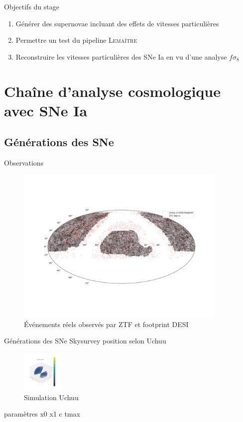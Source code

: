 \documentclass{beamer}
\newcommand{\lemaitre}{\textsc{Lemaître}\xspace}
\begin{document}
\begin{frame}{Objectifs du stage}
\begin{enumerate}
\itemsep2em 
\item Générer des supernovae incluant des effets de vitesses particulières
\item Permettre un test du pipeline \lemaitre
\item Reconstruire les vitesses particulières des SNe Ia en vu d'une analyse $f\sigma_8$
\end{enumerate}
\end{frame}

\section{Chaîne d'analyse cosmologique avec SNe Ia}



\subsection{Générations des SNe}

\begin{frame}{Observations}
\begin{figure}
	\centering
	\includegraphics[width=0.9\textwidth, trim = {3cm, 5cm, 2cm, 5cm}, clip]{figures/ZTF_on_DESI.png}
	\caption{Événements réels observés par ZTF et footprint DESI}
\end{figure}
\end{frame}

\begin{frame}{Générations des SNe}
Skysurvey
position selon Uchuu
\begin{figure}
	\centering
	\includegraphics[height=2cm, trim={2cm 2cm 2cm 2cm}, clip]{figures/Uchuu.png}
	\caption{Simulation Uchuu}
\end{figure}
paramètres x0 x1 c tmax
\end{frame}
\end{document}
